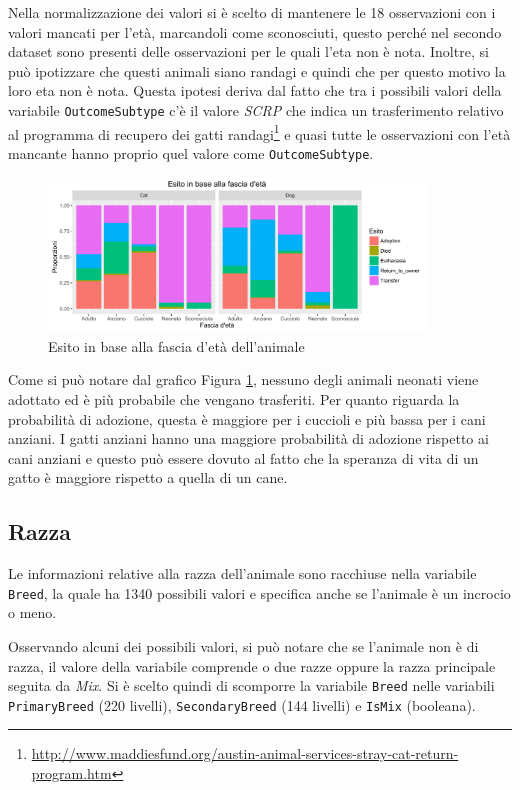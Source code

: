 Nella normalizzazione dei valori si è scelto di mantenere le 18 osservazioni con i valori mancati per l'età, marcandoli come sconosciuti, questo perché nel secondo dataset sono presenti delle osservazioni per le quali l'eta non è nota. Inoltre, si può ipotizzare che questi animali siano randagi e quindi che per questo motivo la loro eta non è nota.
Questa ipotesi deriva dal fatto che tra i possibili valori della variabile \texttt{OutcomeSubtype} c'è il valore \textit{SCRP} che indica un trasferimento relativo al programma di recupero dei gatti randagi\footnote{\url{http://www.maddiesfund.org/austin-animal-services-stray-cat-return-program.htm}} e quasi tutte le osservazioni con l'età mancante hanno proprio quel valore come \texttt{OutcomeSubtype}.

\begin{figure}[htbp]
	\centering
	\includegraphics[width=0.9\textwidth]{./grafici/esito_eta.pdf}
	\caption{Esito in base alla fascia d'età dell'animale}\label{fig-eta}
\end{figure}

Come si può notare dal grafico Figura \ref{fig-eta}, nessuno degli animali neonati viene adottato ed è più probabile che vengano trasferiti. Per quanto riguarda la probabilità di adozione, questa è maggiore per i cuccioli e più bassa per i cani anziani. I gatti anziani hanno una maggiore probabilità di adozione rispetto ai cani anziani e questo può essere dovuto al fatto che la speranza di vita di un gatto è maggiore rispetto a quella di un cane.

\subsection{Razza}

Le informazioni relative alla razza dell'animale sono racchiuse nella variabile \texttt{Breed}, la quale ha 1340 possibili valori e specifica anche se l'animale è un incrocio o meno.

Osservando alcuni dei possibili valori, si può notare che se l'animale non è di razza, il valore della variabile comprende o due razze oppure la razza principale seguita da \textit{Mix}. Si è scelto quindi di scomporre la variabile \texttt{Breed} nelle variabili \texttt{PrimaryBreed} (220 livelli), \texttt{SecondaryBreed} (144 livelli) e \texttt{IsMix} (booleana).

